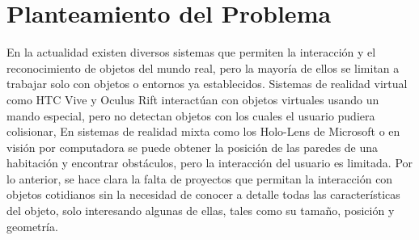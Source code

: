 
\section{Planteamiento del Problema}

    En la actualidad existen diversos sistemas que permiten la interacción y el reconocimiento de objetos del mundo real, pero la mayoría de ellos se limitan a trabajar solo con objetos o entornos ya establecidos. Sistemas de realidad virtual como HTC Vive \cite{VIVEDis84:online} y Oculus Rift \cite{OculusRi96:online} interactúan con objetos virtuales usando un mando especial, pero no detectan objetos con los cuales el usuario pudiera colisionar, En sistemas de realidad mixta como los Holo-Lens de Microsoft \cite{HoloLens} o en visión por computadora  se puede obtener la posición de las paredes de una habitación y encontrar obstáculos, pero la interacción del usuario es limitada. Por lo anterior, se hace clara la falta de proyectos que permitan la interacción con objetos cotidianos  sin la necesidad de conocer a detalle todas las características del objeto, solo interesando algunas de ellas, tales como su tamaño, posición y geometría.
    